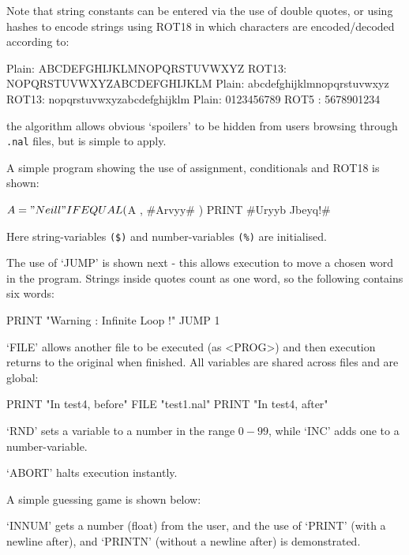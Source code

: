 Note that string constants can be entered via the use of double quotes, or using hashes to encode strings using ROT18 
in which characters are encoded/decoded according to:
\begin{terminaloutput}
Plain: ABCDEFGHIJKLMNOPQRSTUVWXYZ
ROT13: NOPQRSTUVWXYZABCDEFGHIJKLM
Plain: abcdefghijklmnopqrstuvwxyz
ROT13: nopqrstuvwxyzabcdefghijklm
Plain: 0123456789
ROT5 : 5678901234
\end{terminaloutput}
the algorithm allows obvious `spoilers' to be hidden from users
browsing through \verb^.nal^ files, but is simple to apply.

A simple program showing the use of assignment, conditionals and ROT18 is shown:
\begin{codesnippet}
{
   $A = "Neill"
   IFEQUAL ( $A , #Arvyy# ) {
      PRINT #Uryyb Jbeyq!#
   }
}
\end{codesnippet}
Here string-variables \verb^($)^ and number-variables \verb^(%)^ are
initialised.

The use of `JUMP' is shown next - this allows execution to move a chosen word in the program. Strings inside quotes count as one word, so the following contains six words:
\begin{codesnippet}
{
   PRINT "Warning : Infinite Loop !"
   JUMP 1
}
\end{codesnippet}
`FILE' allows another file to be executed (as <PROG>) and then execution returns to the original when finished. All variables are shared across files and are global:
\begin{codesnippet}
{
   PRINT "In test4, before"
   FILE "test1.nal"
   PRINT "In test4, after"
}
\end{codesnippet}
`RND' sets a variable to a number in the range $0 - 99$, while `INC' adds one to a number-variable.
`ABORT' halts execution instantly.

A simple guessing game is shown below:
`INNUM' gets a number (float) from the user, and the use of `PRINT' (with a newline after), and `PRINTN' (without a newline after) is demonstrated.
